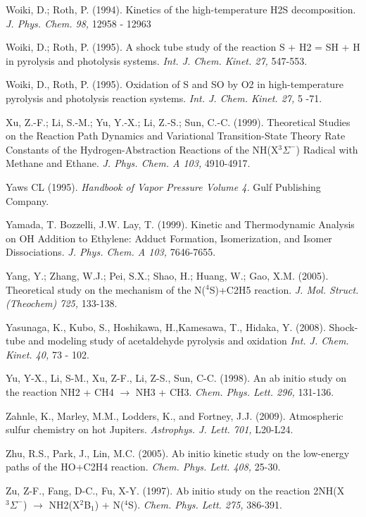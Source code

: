\documentclass[12pt,landscape]{article}
\newcounter{reaction}
\newcounter{photo}
\begin{document}
Woiki, D.; Roth, P. (1994). Kinetics of the high-temperature H2S decomposition.  {\em J. Phys. Chem. 98,} 12958 - 12963

Woiki, D.; Roth, P. (1995). A shock tube study of the reaction S + H2 = SH + H in pyrolysis and photolysis systems. {\em Int. J. Chem. Kinet. 27,}  547-553.

Woiki, D., Roth, P. (1995). Oxidation of S and SO by O2 in high-temperature pyrolysis and photolysis reaction systems. {\em Int. J. Chem. Kinet. 27,} 5 -71.

Xu, Z.-F.; Li, S.-M.; Yu, Y.-X.; Li, Z.-S.; Sun, C.-C. (1999).  Theoretical Studies on the Reaction Path Dynamics and Variational Transition-State Theory Rate Constants of the Hydrogen-Abstraction Reactions of the NH(X$^3\Sigma^-$) Radical with Methane and Ethane. {\em J. Phys. Chem. A 103,} 4910-4917.

Yaws CL (1995).  {\em Handbook of Vapor Pressure Volume 4.}
Gulf Publishing Company.

Yamada, T. Bozzelli, J.W. Lay, T. (1999). Kinetic and Thermodynamic Analysis on OH Addition to Ethylene: Adduct Formation, Isomerization, and Isomer Dissociations.
{\em J. Phys. Chem. A  103,} 7646-7655.

Yang, Y.; Zhang, W.J.; Pei, S.X.; Shao, H.; Huang, W.; Gao, X.M. (2005). Theoretical study on the mechanism of the N($^4$S)+C2H5 reaction.  {\em J. Mol. Struct. (Theochem) 725,} 133-138.

Yasunaga, K., Kubo, S., Hoshikawa, H.,Kamesawa, T., Hidaka, Y. (2008). Shock-tube and modeling study of acetaldehyde pyrolysis and oxidation
{\em Int. J. Chem. Kinet. 40,} 73 - 102.

Yu, Y-X., Li, S-M., Xu, Z-F., Li, Z-S., Sun, C-C. (1998). An ab initio study on the reaction NH2 + CH4 $\rightarrow$ NH3 + CH3. {\em Chem. Phys. Lett. 296,} 131-136.

Zahnle, K., Marley, M.M., Lodders, K., and Fortney, J.J. (2009). Atmospheric sulfur chemistry on hot Jupiters. {\em Astrophys. J. Lett. 701,} L20-L24.

Zhu, R.S., Park, J., Lin, M.C. (2005). Ab initio kinetic study on the low-energy paths of the HO+C2H4 reaction.  {\em Chem. Phys. Lett. 408,} 25-30.

Zu, Z-F., Fang, D-C., Fu, X-Y. (1997). Ab initio study on the reaction 2NH(X$^3\Sigma^-$)  $\rightarrow$ NH2(X$^2$B$_1$) + N($^4$S).  {\em Chem. Phys. Lett. 275,} 386-391.
\end{document}
